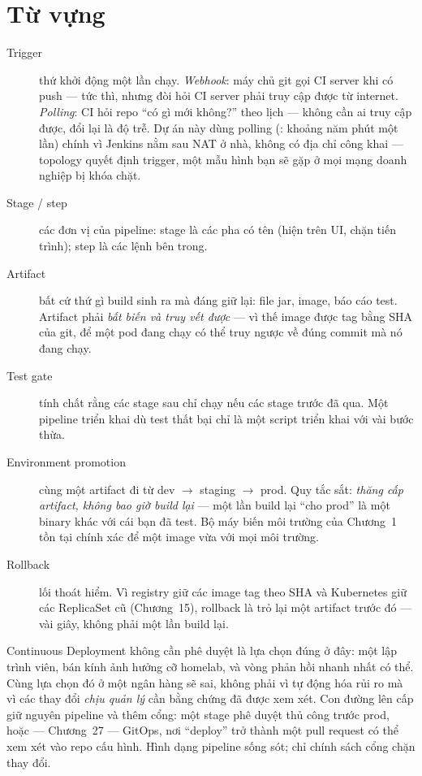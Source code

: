 \section{Từ vựng}

\begin{description}
  \item[Trigger] thứ khởi động một lần chạy. \emph{Webhook}: máy chủ
  git gọi CI server khi có push --- tức thì, nhưng đòi hỏi CI server
  phải truy cập được từ internet. \emph{Polling}: CI hỏi repo ``có gì
  mới không?'' theo lịch --- không cần ai truy cập được, đổi lại là độ
  trễ. Dự án này dùng polling (: khoảng năm phút một
  lần) chính vì Jenkins nằm sau NAT ở nhà, không có địa chỉ công khai
  --- topology quyết định trigger, một mẫu hình bạn sẽ gặp ở mọi mạng
  doanh nghiệp bị khóa chặt.
  \item[Stage / step] các đơn vị của pipeline: stage là các pha có
  tên (hiện trên UI, chặn tiến trình); step là các lệnh bên trong.
  \item[Artifact] bất cứ thứ gì build sinh ra mà đáng giữ lại: file
  jar, image, báo cáo test. Artifact phải \emph{bất biến và truy vết
  được} --- vì thế image được tag bằng SHA của git, để một pod đang
  chạy có thể truy ngược về đúng commit mà nó đang chạy.
  \item[Test gate] tính chất rằng các stage sau chỉ chạy nếu các stage
  trước đã qua. Một pipeline triển khai dù test thất bại chỉ là một
  script triển khai với vài bước thừa.
  \item[Environment promotion] cùng một artifact đi từ dev
  $\rightarrow$ staging $\rightarrow$ prod. Quy tắc sắt: \emph{thăng
  cấp artifact, không bao giờ build lại} --- một lần build lại ``cho
  prod'' là một binary khác với cái bạn đã test. Bộ máy biến môi
  trường của Chương~1 tồn tại chính xác để một image vừa với mọi môi
  trường.
  \item[Rollback] lối thoát hiểm. Vì registry giữ các image tag theo
  SHA và Kubernetes giữ các ReplicaSet cũ (Chương~15), rollback là trỏ
  lại một artifact trước đó --- vài giây, không phải một lần build
  lại.
\end{description}

\begin{decision}
Continuous Deployment không cần phê duyệt là lựa chọn đúng ở đây: một
lập trình viên, bán kính ảnh hưởng cỡ homelab, và vòng phản hồi nhanh
nhất có thể. Cùng lựa chọn đó ở một ngân hàng sẽ sai, không phải vì tự
động hóa rủi ro mà vì các thay đổi \emph{chịu quản lý} cần bằng chứng
đã được xem xét. Con đường lên cấp giữ nguyên pipeline và thêm cổng:
một stage phê duyệt thủ công trước prod, hoặc --- Chương~27 --- GitOps,
nơi ``deploy'' trở thành một pull request có thể xem xét vào repo cấu
hình. Hình dạng pipeline sống sót; chỉ chính sách cổng chặn thay đổi.
\end{decision}

